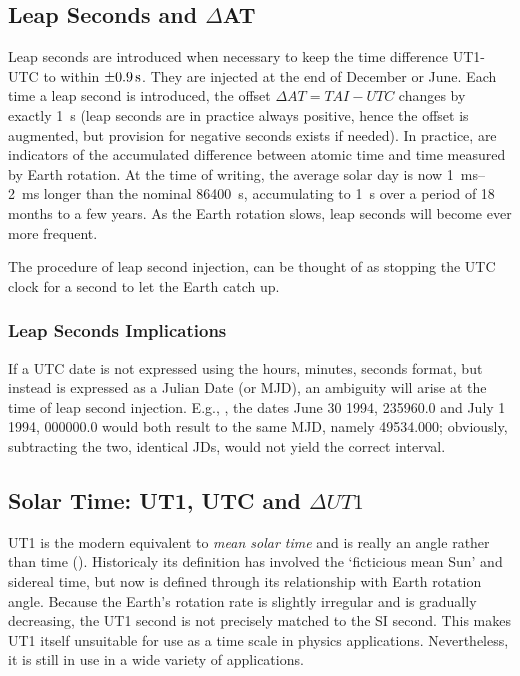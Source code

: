 \subsection{Leap Seconds and $\Delta$AT}
\label{ssec:leap-seconds-dat}
Leap seconds are introduced when necessary to keep the time difference UT1-UTC 
to within \(\SI{\pm 0.9}{\second}\). They are injected at the end of December or 
June. Each time a leap second is introduced, the offset \(\Delta AT = TAI - UTC\) 
changes by exactly \SI{1}{\second} (leap seconds are in practice always positive, hence 
the offset is augmented, but provision for negative seconds exists if needed). In 
practice, are indicators of the accumulated difference between atomic time and time 
measured by Earth rotation. At the time of writing, the average solar day 
is now \SIrange{1}{2}{\milli\second} longer than the nominal \SI{86400}{\second}, accumulating 
to \SI{1}{\second} over a period of 18 months to a few years. As the Earth rotation 
slows, leap seconds will become ever more frequent.

The procedure of leap second injection, can be thought of as stopping the UTC clock 
for a second to let the Earth catch up.

\subsubsection{Leap Seconds Implications}
If a UTC date is not expressed using the hours, minutes, seconds format, but instead 
is expressed as a Julian Date (or MJD), an ambiguity will 
arise at the time of leap second injection. E.g., \cite{SOFA20210125}, the dates 
June 30 1994, 235960.0 and July 1 1994, 000000.0 would both result to the same 
MJD, namely 49534.000; obviously, subtracting the two, identical JDs, would not 
yield the correct interval.

\subsection{Solar Time: UT1, UTC and $\Delta UT1$}
UT1 is the modern equivalent to \emph{mean solar time} and is really an angle rather 
than time (\cite{SOFA20210125}). Historicaly its definition has involved the 
`ficticious mean Sun' and sidereal time, but now is defined through its relationship 
with Earth rotation angle. Because the Earth’s rotation rate is slightly irregular
and is gradually decreasing, the UT1 second is not precisely matched to the SI second.
This makes UT1 itself unsuitable for use as a time scale in physics applications.
Nevertheless, it is still in use in a wide variety of applications.

